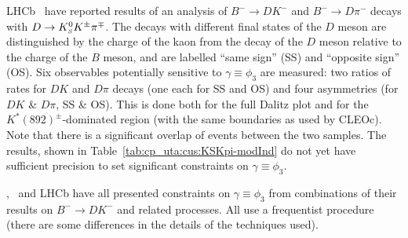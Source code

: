 LHCb~\cite{Aaij:2014dia} have reported results of an analysis of $B^-\to D K^-$ and $B^- \to D \pi^-$ decays with $D \to K^0_{\scriptscriptstyle S}K^\pm\pi^\mp$. 
The decays with different final states of the $D$ meson are distinguished by the charge of the kaon from the decay of the $D$ meson relative to the charge of the $B$ meson, and are labelled ``same sign'' (SS) and ``opposite sign'' (OS). 
Six observables potentially sensitive to $\gamma \equiv \phi_3$ are measured: two ratios of rates for $DK$ and $D\pi$ decays (one each for SS and OS) and four asymmetries (for $DK$ \& $D\pi$, SS \& OS). 
This is done both for the full Dalitz plot and for the $K^*(892)^\pm$-dominated region (with the same boundaries as used by CLEOc). 
Note that there is a significant overlap of events between the two samples. 
The results, shown in Table~\ref{tab:cp_uta:cus:KSKpi-modInd} do not yet have sufficient precision to set significant constraints on $\gamma \equiv \phi_3$. 

\label{sec:cp_uta:cus:gamma}

\babar, \belle\ and LHCb have all presented constraints on $\gamma \equiv \phi_3$ from combinations of their results on $B^- \to DK^-$ and related processes.
All use a frequentist procedure (there are some differences in the details of the techniques used).

